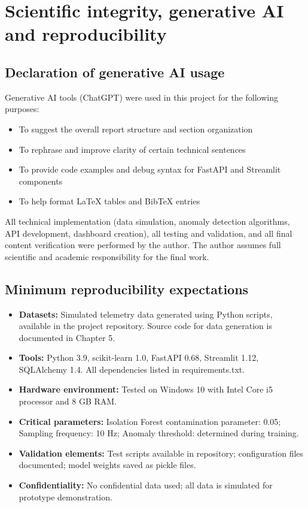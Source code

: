 \chapter{Scientific integrity, generative AI and reproducibility}

\section{Declaration of generative AI usage}

Generative AI tools (ChatGPT) were used in this project for the following purposes:
\begin{itemize}
    \item To suggest the overall report structure and section organization
    \item To rephrase and improve clarity of certain technical sentences
    \item To provide code examples and debug syntax for FastAPI and Streamlit components
    \item To help format LaTeX tables and BibTeX entries
\end{itemize}

All technical implementation (data simulation, anomaly detection algorithms, API development, dashboard creation), all testing and validation, and all final content verification were performed by the author. The author assumes full scientific and academic responsibility for the final work.

\section{Minimum reproducibility expectations}

\begin{itemize}
    \item \textbf{Datasets:} Simulated telemetry data generated using Python scripts, available in the project repository. Source code for data generation is documented in Chapter 5.
    \item \textbf{Tools:} Python 3.9, scikit-learn 1.0, FastAPI 0.68, Streamlit 1.12, SQLAlchemy 1.4. All dependencies listed in requirements.txt.
    \item \textbf{Hardware environment:} Tested on Windows 10 with Intel Core i5 processor and 8 GB RAM.
    \item \textbf{Critical parameters:} Isolation Forest contamination parameter: 0.05; Sampling frequency: 10 Hz; Anomaly threshold: determined during training.
    \item \textbf{Validation elements:} Test scripts available in repository; configuration files documented; model weights saved as pickle files.
    \item \textbf{Confidentiality:} No confidential data used; all data is simulated for prototype demonstration.
\end{itemize}

